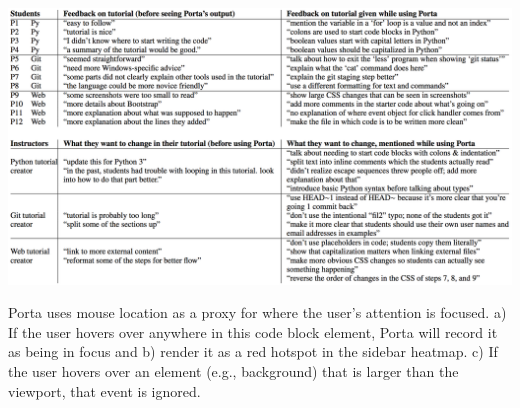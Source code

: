 \begin{table}
  \label{tab:study-feedback}
  \includegraphics[width=\linewidth]{figures/porta/tbl_feedback.png}
  \caption{Porta uses mouse location as a proxy for where the user's
    attention is focused. a) If the user hovers over anywhere in this code
    block element, Porta will record it as being in focus and b) render it
    as a red hotspot in the sidebar heatmap. c) If the user hovers over an
    element (e.g., background) that is larger than the viewport, that event
    is ignored.}
\end{table}



%


